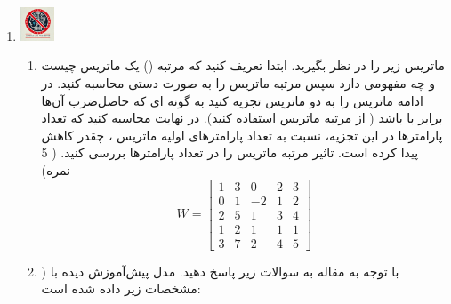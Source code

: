 \documentclass[12pt]{article}
\begin{document}
\begin{enumerate}
     
    \item \includegraphics[width=1cm]{figs/Forbidden_AI.jpg}
    \begin{enumerate}
            \item ماتریس  زیر را در نظر بگیرید. ابتدا تعریف کنید که مرتبه () یک ماتریس چیست و چه مفهومی دارد سپس مرتبه ماتریس  را به صورت دستی محاسبه کنید. در ادامه ماتریس  را به دو ماتریس تجزیه کنید به گونه ای که حاصل‌ضرب آن‌ها برابر با   باشد ( از مرتبه ماتریس استفاده کنید). در نهایت محاسبه کنید که تعداد پارامترها در این تجزیه، نسبت به تعداد پارامترهای اولیه ماتریس ، چقدر کاهش پیدا کرده است. تاثیر مرتبه ماتریس را در تعداد پارامترها بررسی کنید. ( 5 نمره) 
        $$
            W=\left[\begin{array}{ccccc}
            1 & 3 & 0 & 2 & 3 \\
            0 & 1 & -2 & 1 & 2 \\
            2 & 5 & 1 & 3 & 4 \\
            1 & 2 & 1 & 1 & 1 \\
            3 & 7 & 2 & 4 & 5
            \end{array}\right]
        $$
        \item )  با توجه به مقاله  به سوالات زیر پاسخ دهید.  مدل پیش‌آموزش دیده  با مشخصات زیر داده شده است:\\
        \\
        

\end{enumerate}
\end{enumerate}
\end{document}
